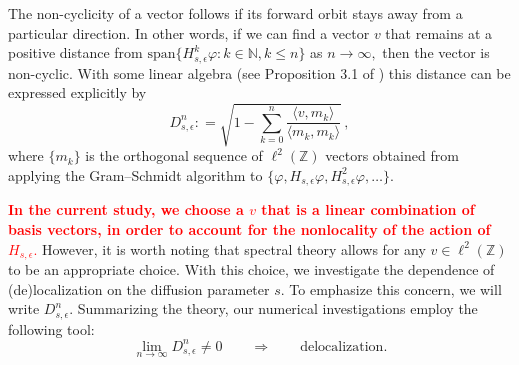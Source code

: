 \documentclass[final,1p,times]{elsarticle}
\def\NN{\mathbb N} %
\def\ZZ{\mathbb Z} %
\theoremstyle{remark}
\theoremstyle{definition}
\newcommand{\josh}[1]{\textcolor{red}{\textbf{#1}}}
\newcommand{\conni}[1]{\textcolor{blue}{\textbf{#1}}}
\begin{document}
The non-cyclicity of a vector follows if its forward orbit stays away from a particular direction. In other words, if we can find a vector $v$ that remains at a positive distance from $\text{span}\{H_{s,\epsilon}^k \varphi:k\in \NN, k\le n\}$ as $n\to\infty,$ then the vector is non-cyclic. With some linear algebra (see Proposition 3.1 of \cite{Liaw2013}) this distance can be expressed explicitly by
\[
D_{s,\epsilon}^n\mathrel{\mathop:}=\sqrt{1-\sum_{k=0}^n\frac{\langle v, m_k\rangle}{\langle m_k, m_k\rangle}}\,,
\]
where $\{m_k\}$ is the orthogonal 
sequence of $\ell^2(\ZZ)$ vectors obtained from applying the Gram--Schmidt algorithm to $\{\varphi, H_{s,\epsilon} \varphi, H^2_{s,\epsilon} \varphi, \hdots\}$.

\josh{In the current study, we choose a $v$ that is a linear combination of basis vectors, in order to account for the nonlocality of the action of $H_{s,\epsilon}.$}
However, it is worth noting that spectral theory allows for any $v\in\ell^2(\ZZ)$ to be an appropriate choice. With this choice, we investigate the dependence of (de)localization on the diffusion parameter $s$. To emphasize this concern, we will write $ D_{s,\epsilon}^n$. 
Summarizing the theory, our numerical investigations employ the following tool:
\[
\lim_{n\to\infty}D_{s,\epsilon}^n \neq 0
\qquad\Rightarrow\qquad\text{delocalization}.
\]


\end{document}
